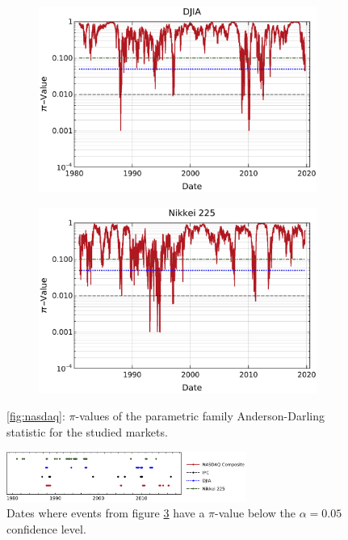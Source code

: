 \documentclass[a4paper]{jpconf}
\begin{document}
\begin{figure}[h!tb]
\begin{subfigure}[b]{0.45\textwidth}
            \includegraphics[width=\textwidth]{img/pvalores_family_DJIA.pdf}
            \caption[]{}      
            \label{fig:dji_fam}
        \end{subfigure}
        \quad
        \begin{subfigure}[b]{0.45\textwidth}   
            \centering 
            \includegraphics[width=\textwidth]{img/pvalores_family_Nikkei.pdf}
            \caption[]{}      
            \label{fig:nikkei_fam}
        \end{subfigure}
        \caption{\small \ref{fig:nasdaq}: $\pi$-values of the parametric family Anderson-Darling statistic for the studied markets.} 
	\label{fig:PiValuesADFam}
\end{figure}

\begin{figure}
\begin{center}
\includegraphics[width=0.70\textwidth]{img/not_geom_dates}
\end{center}
\caption{\small \label{fig:not_geom}Dates where events from figure \ref{fig:PiValuesADFam} have a $\pi$-value below the $\alpha = 0.05$ confidence level.}
\end{figure}
\end{document}
